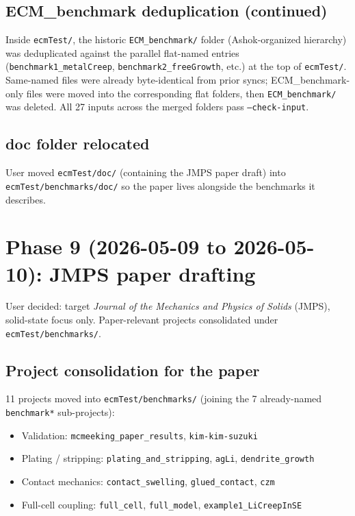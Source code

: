 \documentclass[11pt,letterpaper]{article}
\newenvironment{tightitemize}{\begin{itemize}\setlength\itemsep{0pt}\setlength\parsep{0pt}}{\end{itemize}}
\newcommand{\code}[1]{\texttt{\small #1}}
\begin{document}
\subsection{ECM\_benchmark deduplication (continued)}
Inside \code{ecmTest/}, the historic \code{ECM\_benchmark/} folder (Ashok-organized hierarchy) was deduplicated against the parallel flat-named entries (\code{benchmark1\_metalCreep}, \code{benchmark2\_freeGrowth}, etc.) at the top of \code{ecmTest/}. Same-named files were already byte-identical from prior syncs; ECM\_benchmark-only files were moved into the corresponding flat folders, then \code{ECM\_benchmark/} was deleted. All 27 inputs across the merged folders pass \code{--check-input}.

\subsection{doc folder relocated}
User moved \code{ecmTest/doc/} (containing the JMPS paper draft) into \code{ecmTest/benchmarks/doc/} so the paper lives alongside the benchmarks it describes.

\section{Phase 9 (2026-05-09 to 2026-05-10): JMPS paper drafting}

User decided: target \emph{Journal of the Mechanics and Physics of Solids} (JMPS), solid-state focus only. Paper-relevant projects consolidated under \code{ecmTest/benchmarks/}.

\subsection{Project consolidation for the paper}
11 projects moved into \code{ecmTest/benchmarks/} (joining the 7 already-named \code{benchmark*} sub-projects):

\begin{tightitemize}
  \item Validation: \code{mcmeeking\_paper\_results}, \code{kim-kim-suzuki}
  \item Plating / stripping: \code{plating\_and\_stripping}, \code{agLi}, \code{dendrite\_growth}
  \item Contact mechanics: \code{contact\_swelling}, \code{glued\_contact}, \code{czm}
  \item Full-cell coupling: \code{full\_cell}, \code{full\_model}, \code{example1\_LiCreepInSE}
\end{tightitemize}
\end{document}
